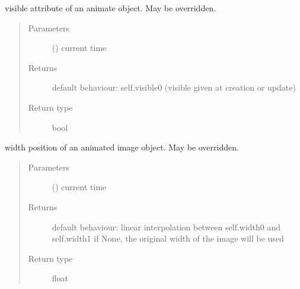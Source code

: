 \documentclass[letterpaper,10pt,english]{sphinxmanual}
\begin{document}
\begin{fulllineitems}

\begin{fulllineitems}
\label{\detokenize{Reference:salabim.Animate.visible}}
visible attribute of an animate object. May be overridden.
\begin{quote}\begin{description}
\item[{Parameters}] \leavevmode
{} () \textendash{} current time

\item[{Returns}] \leavevmode
{} \textendash{} default behaviour: self.visible0 (visible given at creation or update)

\item[{Return type}] \leavevmode
bool

\end{description}\end{quote}

\end{fulllineitems}


\begin{fulllineitems}
\label{\detokenize{Reference:salabim.Animate.width}}
width position of an animated image object. May be overridden.
\begin{quote}\begin{description}
\item[{Parameters}] \leavevmode
{} () \textendash{} current time

\item[{Returns}] \leavevmode
{} \textendash{} default behaviour: linear interpolation between self.width0 and self.width1 
if None, the original width of the image will be used

\item[{Return type}] \leavevmode
float

\end{description}\end{quote}

\end{fulllineitems}



\end{fulllineitems}
\end{document}
